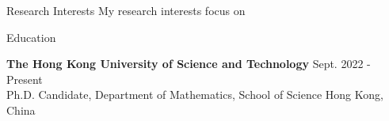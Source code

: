 \documentclass{resume} %
\begin{document}

\begin{rSection}{Research Interests}
My research interests focus on

\end{rSection}


\begin{rSection}{Education}

{\bf The Hong Kong University of Science and Technology} \hfill { Sept. 2022 - Present} \\
Ph.D. Candidate, Department of Mathematics, School of Science \hfill { Hong Kong, China} \\



\end{rSection}

\end{document}
